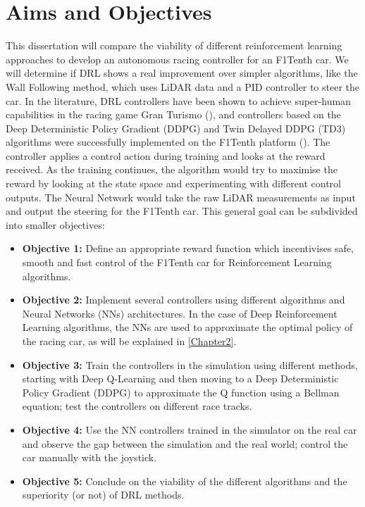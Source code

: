 \section{Aims and Objectives}
\label{metricssection}

This dissertation will compare the viability of different reinforcement learning approaches to develop an autonomous racing controller for an F1Tenth car. We will determine if DRL shows a real improvement over simpler algorithms, like the Wall Following method, which uses LiDAR data and a PID controller to steer the car. In the literature, DRL controllers have been shown to achieve super-human capabilities in the racing game Gran Turismo (\cite{granturismo}), and controllers based on the Deep Deterministic Policy Gradient (DDPG) and Twin Delayed DDPG (TD3) algorithms were successfully implemented on the F1Tenth platform (\cite{Reference4}). The controller applies a control action during training and looks at the reward received. As the training continues, the algorithm would try to maximise the reward by looking at the state space and experimenting with different control outputs. The Neural Network would take the raw LiDAR measurements as input and output the steering for the F1Tenth car. This general goal can be subdivided into smaller objectives:

\begin{itemize}
\item \textbf{Objective 1:} Define an appropriate reward function which incentivises safe, smooth and fast control of the F1Tenth car for Reinforcement Learning algorithms.
\item \textbf{Objective 2:} Implement several controllers using different algorithms and Neural Networks (NNs) architectures. In the case of Deep Reinforcement Learning algorithms, the NNs are used to approximate the optimal policy of the racing car, as will be explained in \ref{Chapter2}.
\item \textbf{Objective 3:} Train the controllers in the simulation using different methods, starting with Deep Q-Learning and then moving to a Deep Deterministic Policy Gradient (DDPG) to approximate the Q function using a Bellman equation; test the controllers on different race tracks.
\item \textbf{Objective 4:} Use the NN controllers trained in the simulator on the real car and observe the gap between the simulation and the real world; control the car manually with the joystick.
\item \textbf{Objective 5:} Conclude on the viability of the different algorithms and the superiority (or not) of DRL methods.
\end{itemize}

